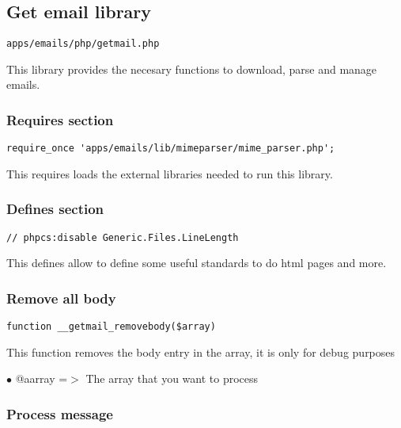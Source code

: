 \documentclass[a4paper]{article}
\begin{document}
\hypertarget{toc68}{}
\subsection{Get email library}

\begin{lstlisting}
apps/emails/php/getmail.php
\end{lstlisting}

This library provides the necesary functions to download, parse and manage emails.

\hypertarget{toc69}{}
\subsubsection{Requires section}

\begin{lstlisting}
require_once 'apps/emails/lib/mimeparser/mime_parser.php';
\end{lstlisting}

This requires loads the external libraries needed to run this library.

\hypertarget{toc70}{}
\subsubsection{Defines section}

\begin{lstlisting}
// phpcs:disable Generic.Files.LineLength
\end{lstlisting}

This defines allow to define some useful standards to do html pages and more.

\hypertarget{toc71}{}
\subsubsection{Remove all body}

\begin{lstlisting}
function __getmail_removebody($array)
\end{lstlisting}

This function removes the body entry in the array, it is only for debug purposes

\begin{compactitem}
\item[\color{myblue}$\bullet$] @aarray =$>$ The array that you want to process
\end{compactitem}

\hypertarget{toc72}{}
\subsubsection{Process message}
\end{document}
